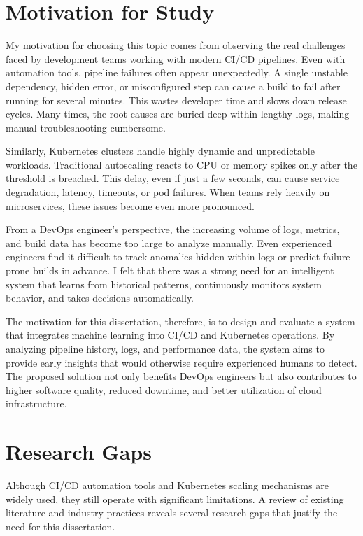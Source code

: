\documentclass[12pt]{report}
\begin{document}
\section{Motivation for Study}

My motivation for choosing this topic comes from observing the real challenges faced by development teams working with modern CI/CD pipelines. Even with automation tools, pipeline failures often appear unexpectedly. A single unstable dependency, hidden error, or misconfigured step can cause a build to fail after running for several minutes. This wastes developer time and slows down release cycles. Many times, the root causes are buried deep within lengthy logs, making manual troubleshooting cumbersome.

Similarly, Kubernetes clusters handle highly dynamic and unpredictable workloads. Traditional autoscaling reacts to CPU or memory spikes only after the threshold is breached. This delay, even if just a few seconds, can cause service degradation, latency, timeouts, or pod failures. When teams rely heavily on microservices, these issues become even more pronounced.

From a DevOps engineer's perspective, the increasing volume of logs, metrics, and build data has become too large to analyze manually. Even experienced engineers find it difficult to track anomalies hidden within logs or predict failure-prone builds in advance. I felt that there was a strong need for an intelligent system that learns from historical patterns, continuously monitors system behavior, and takes decisions automatically.

The motivation for this dissertation, therefore, is to design and evaluate a system that integrates machine learning into CI/CD and Kubernetes operations. By analyzing pipeline history, logs, and performance data, the system aims to provide early insights that would otherwise require experienced humans to detect. The proposed solution not only benefits DevOps engineers but also contributes to higher software quality, reduced downtime, and better utilization of cloud infrastructure.

\section{Research Gaps}

Although CI/CD automation tools and Kubernetes scaling mechanisms are widely used, they still operate with significant limitations. A review of existing literature and industry practices reveals several research gaps that justify the need for this dissertation.
\end{document}
